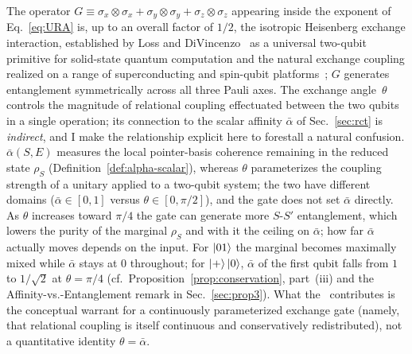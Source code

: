 The operator $G \equiv \sigma_x\otimes\sigma_x +
\sigma_y\otimes\sigma_y + \sigma_z\otimes\sigma_z$ appearing inside
the exponent of Eq.~\eqref{eq:URA} is, up to an overall factor of
$1/2$, the isotropic Heisenberg exchange interaction, established by
Loss and DiVincenzo~\cite{LossDiVincenzo1998} as a universal two-qubit
primitive for solid-state quantum computation and the natural exchange
coupling realized on a range of superconducting and spin-qubit
platforms~\cite{Krantz2019,Caldwell2018,Foxen2020,Abrams2020};
$G$ generates entanglement symmetrically across all three Pauli axes.
The exchange angle~$\theta$ controls the magnitude of relational coupling
effectuated between the two qubits in a single operation; its connection
to the scalar affinity $\bar\alpha$ of Sec.~\ref{sec:rct} is
\emph{indirect}, and I make the relationship explicit here to forestall
a natural confusion.
$\bar\alpha(S,E)$ measures the local pointer-basis coherence remaining in
the reduced state $\rho_S$ (Definition~\ref{def:alpha-scalar}), whereas
$\theta$ parameterizes the coupling strength of a unitary applied to a
two-qubit system; the two have different domains
($\bar\alpha \in [0,1]$ versus $\theta \in [0,\pi/2]$), and the
gate does not set $\bar\alpha$ directly.
As $\theta$ increases toward $\pi/4$ the gate can generate more
$S$-$S'$ entanglement, which lowers the purity of the marginal
$\rho_S$ and with it the ceiling on $\bar\alpha$; how far $\bar\alpha$
actually moves depends on the input.
For $\ket{01}$ the marginal becomes maximally mixed while $\bar\alpha$
stays at $0$ throughout; for $\ket{+}\ket{0}$, $\bar\alpha$ of the first
qubit falls from $1$ to $1/\sqrt{2}$ at $\theta = \pi/4$
(cf.\ Proposition~\ref{prop:conservation}, part~(iii)
and the Affinity-vs.-Entanglement remark in Sec.~\ref{sec:prop3}).
What the \RCF~contributes is the conceptual warrant for a continuously
parameterized exchange gate (namely, that relational coupling is itself continuous and conservatively redistributed), not a quantitative identity $\theta = \bar\alpha$.

